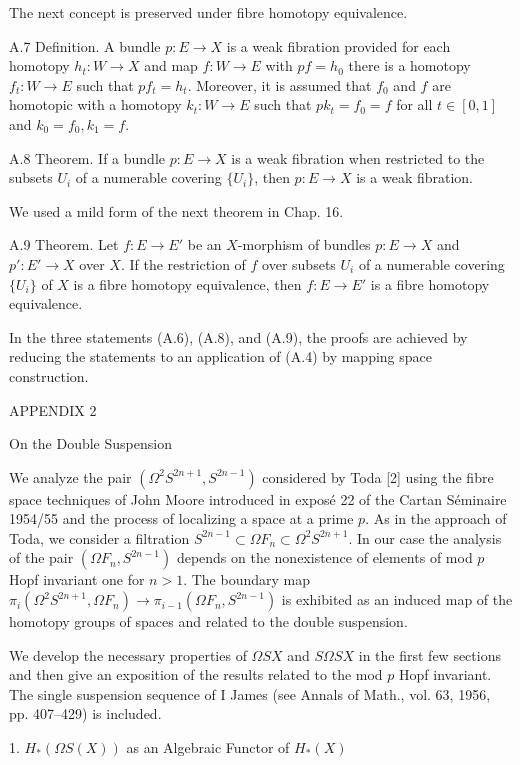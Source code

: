 The next concept is preserved under fibre homotopy equivalence.

A.7 Definition. A bundle $p: E \rightarrow X$ is a weak fibration provided for each homotopy $h_t: W \rightarrow X$ and map $f: W \rightarrow E$ with $pf = h_0$ there is a homotopy $f_t: W \rightarrow E$ such that $pf_t = h_t$. Moreover, it is assumed that $f_0$ and $f$ are homotopic with a homotopy $k_t: W \rightarrow E$ such that $pk_t = f_0 = f$ for all $t \in [0,1]$ and $k_0 = f_0, k_1 = f$.

A.8 Theorem. If a bundle $p: E \rightarrow X$ is a weak fibration when restricted to the subsets $U_i$ of a numerable covering $\{U_i\}$, then $p: E \rightarrow X$ is a weak fibration.

We used a mild form of the next theorem in Chap. 16.

A.9 Theorem. Let $f: E \rightarrow E'$ be an $X$-morphism of bundles $p: E \rightarrow X$ and $p': E' \rightarrow X$ over $X$. If the restriction of $f$ over subsets $U_i$ of a numerable covering $\{U_i\}$ of $X$ is a fibre homotopy equivalence, then $f: E \rightarrow E'$ is a fibre homotopy equivalence.

In the three statements (A.6), (A.8), and (A.9), the proofs are achieved by reducing the statements to an application of (A.4) by mapping space construction.

APPENDIX 2

On the Double Suspension

We analyze the pair $(\Omega^2 S^{2n+1}, S^{2n-1})$ considered by Toda [2] using the fibre space techniques of John Moore introduced in exposé 22 of the Cartan Séminaire 1954/55 and the process of localizing a space at a prime $p$. As in the approach of Toda, we consider a filtration $S^{2n-1} \subset \Omega F_n \subset \Omega^2 S^{2n+1}$. In our case the analysis of the pair $(\Omega F_n, S^{2n-1})$ depends on the nonexistence of elements of mod $p$ Hopf invariant one for $n > 1$. The boundary map $\pi_i(\Omega^2 S^{2n+1}, \Omega F_n) \rightarrow \pi_{i-1}(\Omega F_n, S^{2n-1})$ is exhibited as an induced map of the homotopy groups of spaces and related to the double suspension.

We develop the necessary properties of $\Omega SX$ and $S\Omega SX$ in the first few sections and then give an exposition of the results related to the mod $p$ Hopf invariant. The single suspension sequence of I James (see Annals of Math., vol. 63, 1956, pp. 407–429) is included.

1. $H_*(\Omega S(X))$ as an Algebraic Functor of $H_*(X)$

